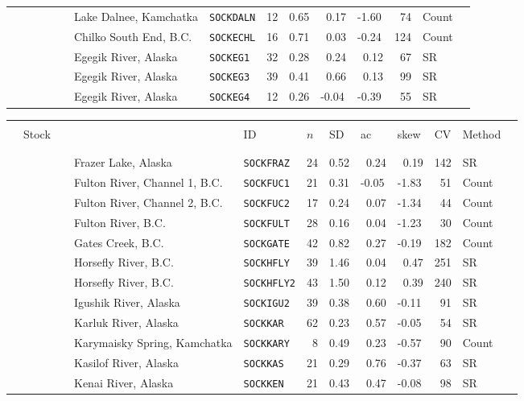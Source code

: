 \begin{flushleft}
\begin{tabular*}{7.1in}{llllllllll}
&~~~~~~~~~Lake Dalnee, Kamchatka&{\tt SOCKDALN}&12&0.65&~0.17&-1.60&~74&Count  & \\ 
&~~~~~~~~~Chilko South End, B.C.&{\tt SOCKECHL}&16&0.71&~0.03&-0.24&124&Count  & \\ 
&~~~~~~~~~Egegik River, Alaska&{\tt SOCKEG1}&32&0.28&~0.24&~0.12&~67&SR  & \\ 
&~~~~~~~~~Egegik River, Alaska&{\tt SOCKEG3}&39&0.41&~0.66&~0.13&~99&SR  & \\ 
&~~~~~~~~~Egegik River, Alaska&{\tt SOCKEG4}&12&0.26&-0.04&-0.39&~55&SR  & \\ 
\end{tabular*} 
\end{flushleft}
\newpage
\begin{flushleft}
\begin{tabular*}{7.1in}{llllllllll} 
\hline \\ 
&{\normalsize Stock}&{\normalsize ID}&{\normalsize $n$}&{\normalsize SD}&{\normalsize ac}&{\normalsize skew}&{\normalsize CV}&{\normalsize Method}  & \\ 
 &&&&&&&&&\\ 
  \hline  &&&&&&&&&\\ 
&~~~~~~~~~Frazer Lake, Alaska&{\tt SOCKFRAZ}&24&0.52&~0.24&~0.19&142&SR  & \\ 
&~~~~~~~~~Fulton River, Channel 1, B.C.&{\tt SOCKFUC1}&21&0.31&-0.05&-1.83&~51&Count  & \\ 
&~~~~~~~~~Fulton River, Channel 2, B.C.&{\tt SOCKFUC2}&17&0.24&~0.07&-1.34&~44&Count  & \\ 
&~~~~~~~~~Fulton River, B.C.&{\tt SOCKFULT}&28&0.16&~0.04&-1.23&~30&Count  & \\ 
&~~~~~~~~~Gates Creek, B.C.&{\tt SOCKGATE}&42&0.82&~0.27&-0.19&182&Count  & \\ 
&~~~~~~~~~Horsefly River, B.C.&{\tt SOCKHFLY}&39&1.46&~0.04&~0.47&251&SR  & \\ 
&~~~~~~~~~Horsefly River, B.C.&{\tt SOCKHFLY2}&43&1.50&~0.12&~0.39&240&SR  & \\ 
&~~~~~~~~~Igushik River, Alaska&{\tt SOCKIGU2}&39&0.38&~0.60&-0.11&~91&SR  & \\ 
&~~~~~~~~~Karluk River, Alaska&{\tt SOCKKAR}&62&0.23&~0.57&-0.05&~54&SR  & \\ 
&~~~~~~~~~Karymaisky Spring, Kamchatka&{\tt SOCKKARY}&~8&0.49&~0.23&-0.57&~90&Count  & \\ 
&~~~~~~~~~Kasilof River, Alaska&{\tt SOCKKAS}&21&0.29&~0.76&-0.37&~63&SR  & \\ 
&~~~~~~~~~Kenai River, Alaska&{\tt SOCKKEN}&21&0.43&~0.47&-0.08&~98&SR  & \\ 

\end{tabular*}
\end{flushleft}
